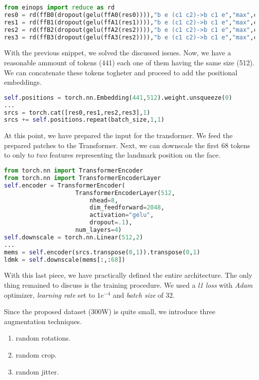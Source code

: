 \begin{lstlisting}[language=Python]
from einops import reduce as rd
res0 = rd(ffB0(dropout(gelu(ffA0(res0)))),"b e (c1 c2)->b c1 e","max",c2=16)
res1 = rd(ffB1(dropout(gelu(ffA1(res1)))),"b e (c1 c2)->b c1 e","max",c2=8)
res2 = rd(ffB2(dropout(gelu(ffA2(res2)))),"b e (c1 c2)->b c1 e","max",c2=4)
res3 = rd(ffB3(dropout(gelu(ffA3(res2)))),"b e (c1 c2)->b c1 e","max",c2=1)
\end{lstlisting}

With the previous snippet, we solved the discussed issues. Now, we have a reasonable ammount of tokens (441) each one of them having the same size (512). We can concatenate these tokens togheter and proceed to add the positional embeddings.

\begin{lstlisting}[language=Python]
self.positions = torch.nn.Embedding(441,512).weight.unsqueeze(0)
...
srcs = torch.cat([res0,res1,res2,res3],1) 
srcs += self.positions.repeat(batch_size,1,1)
\end{lstlisting}

At this point, we have prepared the input for the transformer. We feed the prepared patches to the Transformer. Next, we can downscale the first $68$ tokens to only to $two$ features representing the landmark position on the face.

\begin{lstlisting}[language=Python]
from torch.nn import TransformerEncoder
from torch.nn import TransformerEncoderLayer
self.encoder = TransformerEncoder(
                    TransformerEncoderLayer(512,
                        nhead=8,
                        dim_feedforward=2048,
                        activation="gelu",
                        dropout=.1),
                    num_layers=4)
self.downscale = torch.nn.Linear(512,2)
...
mems = self.encoder(srcs.transpose(0,1)).transpose(0,1)
ldmk = self.downscale(mems[:,:68])
\end{lstlisting}

With this last piece, we have practically defined the entire architecture. The only thing remained to discuss is the training procedure. We used a \textit{l1 loss} with \textit{Adam} optimizer, \textit{learning rate} set to $1e^{-4}$ and \textit{batch size} of $32$.

Since the proposed dataset (300W) is quite small, we introduce three augmentation techniques. 
\begin{enumerate}
    \item random rotations.
    \item random crop.
    \item random jitter.
\end{enumerate}

